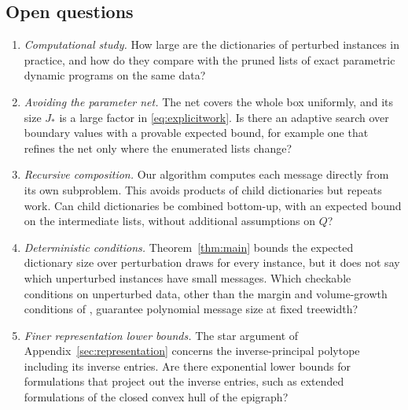 \subsection{Open questions}
\begin{enumerate}
\item \emph{Computational study.} How large are the dictionaries of
perturbed instances in practice, and how do they compare with the pruned
lists of exact parametric dynamic programs
\cite{BhathenaTrees,BhathenaStructured} on the same data?
\item \emph{Avoiding the parameter net.} The net covers the whole box
uniformly, and its size $J_*$ is a large factor in
\eqref{eq:explicitwork}. Is there an adaptive search over boundary values
with a provable expected bound, for example one that refines the net
only where the enumerated lists change?
\item \emph{Recursive composition.} Our algorithm computes each message
directly from its own subproblem. This avoids products of child
dictionaries but repeats work. Can child dictionaries be combined
bottom-up, with an expected bound on the intermediate lists, without
additional assumptions on $Q$?
\item \emph{Deterministic conditions.} Theorem~\ref{thm:main} bounds the
expected dictionary size over perturbation draws for every instance, but
it does not say which unperturbed instances have small messages. Which
checkable conditions on unperturbed data, other than the margin and
volume-growth conditions of \cite{BhathenaStructured}, guarantee
polynomial message size at fixed treewidth?
\item \emph{Finer representation lower bounds.} The star argument of
Appendix~\ref{sec:representation} concerns the inverse-principal polytope
including its inverse entries. Are there exponential lower bounds for
formulations that project out the inverse entries, such as extended
formulations of the closed convex hull of the epigraph?
\end{enumerate}
